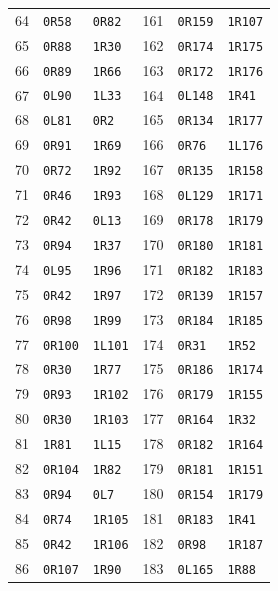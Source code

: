 \begin{longtable}{@{}rll@{\hspace{2em}}rll@{}}
64 & \texttt{0R58} & \texttt{0R82} & 161 & \texttt{0R159} & \texttt{1R107}\\
65 & \texttt{0R88} & \texttt{1R30} & 162 & \texttt{0R174} & \texttt{1R175}\\
66 & \texttt{0R89} & \texttt{1R66} & 163 & \texttt{0R172} & \texttt{1R176}\\
67 & \texttt{0L90} & \texttt{1L33} & 164 & \texttt{0L148} & \texttt{1R41}\\
68 & \texttt{0L81} & \texttt{0R2} & 165 & \texttt{0R134} & \texttt{1R177}\\
69 & \texttt{0R91} & \texttt{1R69} & 166 & \texttt{0R76} & \texttt{1L176}\\
70 & \texttt{0R72} & \texttt{1R92} & 167 & \texttt{0R135} & \texttt{1R158}\\
71 & \texttt{0R46} & \texttt{1R93} & 168 & \texttt{0L129} & \texttt{1R171}\\
72 & \texttt{0R42} & \texttt{0L13} & 169 & \texttt{0R178} & \texttt{1R179}\\
73 & \texttt{0R94} & \texttt{1R37} & 170 & \texttt{0R180} & \texttt{1R181}\\
74 & \texttt{0L95} & \texttt{1R96} & 171 & \texttt{0R182} & \texttt{1R183}\\
75 & \texttt{0R42} & \texttt{1R97} & 172 & \texttt{0R139} & \texttt{1R157}\\
76 & \texttt{0R98} & \texttt{1R99} & 173 & \texttt{0R184} & \texttt{1R185}\\
77 & \texttt{0R100} & \texttt{1L101} & 174 & \texttt{0R31} & \texttt{1R52}\\
78 & \texttt{0R30} & \texttt{1R77} & 175 & \texttt{0R186} & \texttt{1R174}\\
79 & \texttt{0R93} & \texttt{1R102} & 176 & \texttt{0R179} & \texttt{1R155}\\
80 & \texttt{0R30} & \texttt{1R103} & 177 & \texttt{0R164} & \texttt{1R32}\\
81 & \texttt{1R81} & \texttt{1L15} & 178 & \texttt{0R182} & \texttt{1R164}\\
82 & \texttt{0R104} & \texttt{1R82} & 179 & \texttt{0R181} & \texttt{1R151}\\
83 & \texttt{0R94} & \texttt{0L7} & 180 & \texttt{0R154} & \texttt{1R179}\\
84 & \texttt{0R74} & \texttt{1R105} & 181 & \texttt{0R183} & \texttt{1R41}\\
85 & \texttt{0R42} & \texttt{1R106} & 182 & \texttt{0R98} & \texttt{1R187}\\
86 & \texttt{0R107} & \texttt{1R90} & 183 & \texttt{0L165} & \texttt{1R88}\\

\end{longtable}

